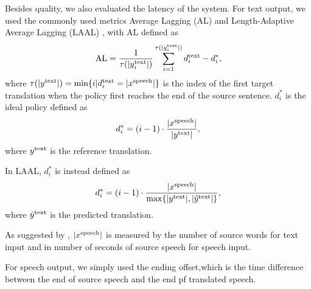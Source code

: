 Besides quality, we also evaluated the latency of the system.
For text output, we used the commonly used metrics Average Lagging (AL) \citep{ma_stacl_2019} and Length-Adaptive Average Lagging (LAAL) \citep{papi-etal-2022-generation}, with AL defined as
\begin{equation}
    \text{AL} = \frac{1}{\tau(|y^{\text{text}}_i|)} \sum_{i=1}^{\tau(|y^{\text{text}}_i|)} d^{\text{text}}_i - d^*_i,
    \label{chap:task-eq:al}
\end{equation}
where $\tau(|y^{\text{text}}|) = \text{min}\{i | d^{\text{text}}_i=|x^{\text{speech}}| \}$ is the index of the first target translation when the policy first reaches the end of the source sentence. $d^*_i$ is the ideal policy defined as
\begin{equation}
	d^*_i = \left(i-1\right) \cdot \frac{|x^{\text{speech}}|}{|y^{\text{text}}|},
	\label{chap:task-eq:al-idea}
\end{equation}
where $y^{\text{text}}$ is the reference translation.

In LAAL, $d^*_i$ is instead defined as
\begin{equation}
	d^*_i = \left(i-1\right) \cdot \frac{|x^{\text{speech}}|}{\max\{|y^{\text{text}}|, |\hat{y}^{\text{text}}|\}},
	\label{chap:task-eq:laal-idea}
\end{equation}
where $\hat{y}^{\text{text}}$ is the predicted translation.

As suggested by \citet{ma_simulmt_2020},
$|x^{\text{speech}}|$ is measured by the number of source words for text input and in number of seconds of source speech for speech input.

For speech output, we simply used the ending offset,which is the time difference between the end of source speech and the end pf translated speech.




